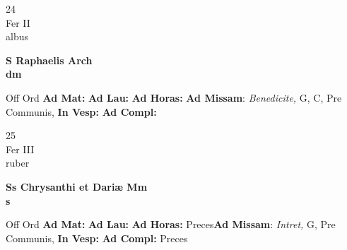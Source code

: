 \documentclass[10pt, openany]{book}
\begin{document}
        \begin{center}
            \begin{minipage}{3.5in}
                \vspace{2em}
                \begin{minipage}{0.5in}
                    {\Huge 24} \\
                    {\normalsize Fer II} \\
                    {\normalsize albus}
                \end{minipage}
                \begin{minipage}{3.0in}
                    \textbf{ \large S Raphaelis Arch \\
                    \textnormal{\normalsize dm}} \\ 
                \end{minipage}
                \begin{justify}Off Ord
                    \textbf{Ad Mat: }
                    \textbf{Ad Lau: }
                    \textbf{Ad Horas: }\textbf{Ad Missam}: \textit{Benedicite,} G, C, Pre Communis,  
                    \textbf{In Vesp: }
                    \textbf{Ad Compl: }
                \end{justify}
            \end{minipage}
        \end{center}
    
        \begin{center}
            \begin{minipage}{3.5in}
                \vspace{2em}
                \begin{minipage}{0.5in}
                    {\Huge 25} \\
                    {\normalsize Fer III} \\
                    {\normalsize ruber}
                \end{minipage}
                \begin{minipage}{3.0in}
                    \textbf{ \large Ss Chrysanthi et Dariæ Mm \\
                    \textnormal{\normalsize s}} \\ 
                \end{minipage}
                \begin{justify}Off Ord
                    \textbf{Ad Mat: }
                    \textbf{Ad Lau: }
                    \textbf{Ad Horas: }Preces\textbf{Ad Missam}: \textit{Intret,} G, Pre Communis,  
                    \textbf{In Vesp: }
                    \textbf{Ad Compl: }Preces
                \end{justify}
            \end{minipage}
        \end{center}
    
\end{document}
